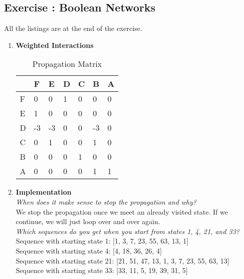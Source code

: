 \documentclass[10pt,a4paper]{article}
\newcommand{\exercise}[1]
{
  \stepcounter{subsection}
  \subsection*{Exercise \thesubsection: #1}

}
\begin{document}
\exercise{Boolean Networks}
All the listings are at the end of the exercise. 
\begin{enumerate}

\item \textbf{Weighted Interactions}\\ 

\begin{table}[H]
	\centering
	\caption{Propagation Matrix }
	\label{my-label}
	\begin{tabular}{l|l|l|l|l|l|l|}
		\cline{2-7}
		& F  & E  & D & C & B  & A \\ \hline
		\multicolumn{1}{|l|}{F} & 0  & 0  & 1 & 0 & 0  & 0 \\ \hline
		\multicolumn{1}{|l|}{E} & 1  & 0  & 0 & 0 & 0  & 0 \\ \hline
		\multicolumn{1}{|l|}{D} & -3 & -3 & 0 & 0 & -3 & 0 \\ \hline
		\multicolumn{1}{|l|}{C} & 0  & 1  & 0 & 0 & 1  & 0 \\ \hline
		\multicolumn{1}{|l|}{B} & 0  & 0  & 0 & 1 & 0  & 0 \\ \hline
		\multicolumn{1}{|l|}{A} & 0  & 0  & 0 & 0 & 1  & 1 \\ \hline
	\end{tabular}
\end{table}


\item \textbf{Implementation}\\

\textit{When does it make sense to stop the propagation and why?}\\

We stop the propagation once we meet an already visited state. If we continue, we will just loop over and over again.\\


\textit{Which sequences do you get when you start from states 1, 4, 21, and 33?}\\

Sequence with starting state 1:  [1, 3, 7, 23, 55, 63, 13, 1]\\
Sequence with starting state 4:  [4, 18, 36, 26, 4]\\
Sequence with starting state 21: [21, 51, 47, 13, 1, 3, 7, 23, 55, 63, 13]\\
Sequence with starting state 33: [33, 11, 5, 19, 39, 31, 5]\\






\end{enumerate}
\end{document}
